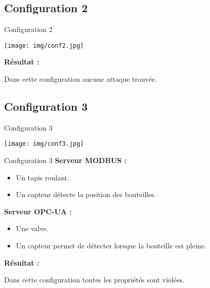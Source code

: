 \documentclass[11pt]{beamer}
\begin{document}
\subsection{Configuration 2}
\begin{frame}{Configuration 2}
\begin{center}
\texttt{[image: img/conf2.jpg]} 
\end{center}
\medskip
\pause
\textbf{Résultat :}\newline

Dans cette configuration aucune attaque trouvée.
\medskip

\end{frame}

\subsection{Configuration 3}
\begin{frame}{Configuration 3}
\begin{center}
\texttt{[image: img/conf3.jpg]} 
\end{center}
\end{frame}

\begin{frame}{Configuration 3}
\textbf{Serveur MODBUS :}
\begin{itemize}
\item Un tapis roulant.
\item Un capteur détecte la position des bouteilles.\newline
\end{itemize}

\textbf{Serveur OPC-UA :}
\begin{itemize}
\item Une valve.
\item Un capteur permet de détecter lorsque la bouteille est pleine.
\end{itemize}

\medskip
\pause
\textbf{Résultat :}\newline

Dans cette configuration toutes les propriétés sont violées.
\medskip

\end{frame}
\end{document}
